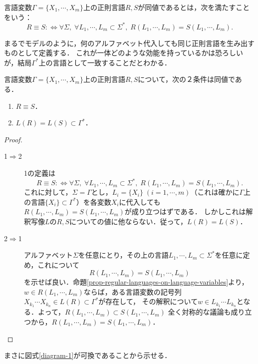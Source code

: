 \documentclass[uplatex, dvipdfmx]{jsreport}
\begin{document}
\begin{definition}[言語変数上の正則表現の同値]\label{def-equivalence-of-universal-regex}
    言語変数$\Gamma=\{X_1,\cdots,X_m\}$上の正則言語$R,S$が同値であるとは，次を満たすことをいう：
    \[ R\equiv S:\Leftrightarrow \forall\Sigma,\;\forall L_1,\cdots,L_m\subset\Sigma^*,\;R(L_1,\cdots,L_m)=S(L_1,\cdots,L_m). \]
\end{definition}
\begin{remarks}
    まるでモデルのように，何のアルファベット代入しても同じ正則言語を生み出すものとして定義する．
    これが一体どのような効能を持っているかは恐ろしいが，結局$\Gamma^*$上の言語として一致することだとわかる．
\end{remarks}

\begin{theorem}[言語変数上の正則表現の同値の特徴付け]
    言語変数$\Gamma=\{X_1,\cdots,X_m\}$上の正則言語$R,S$について，次の２条件は同値である．
    \begin{enumerate}
        \item $R\equiv S$．
        \item $L(R)=L(S)\subset\Gamma^*$．
    \end{enumerate}
\end{theorem}
\begin{proof}\mbox{}
    \begin{description}
        \item[1$\Rightarrow$2] 1の定義は
        \[ R\equiv S:\Leftrightarrow \forall\Sigma,\;\forall L_1,\cdots,L_m\subset\Sigma^*,\;R(L_1,\cdots,L_m)=S(L_1,\cdots,L_m). \]
        これに対して，$\Sigma=\Gamma$とし，$L_i=\{X_i\}\;(i=1,\cdots,m)$（これは確かに$\Gamma$上の言語$\{X_i\}\subset\Gamma^*$）を各変数$X_i$に代入しても
        $R(L_1,\cdots,L_m)=S(L_1,\cdots,L_m)$が成り立つはずである．
        しかしこれは解釈写像$L$の$R,S$についての値に他ならない．従って，$L(R)=L(S)$．
        \item[2$\Rightarrow$1] アルファベット$\Sigma$を任意にとり，その上の言語$L_1,\cdots,L_m\subset\Sigma^*$を任意に定め，これについて
        \[ R(L_1,\cdots,L_m)=S(L_1,\cdots,L_m) \]
        を示せば良い．命題\ref{prop-regular-languages-on-language-variables}より，$w\in R(L_1,\cdots,L_m)$ならば，ある言語変数の記号列$X_{k_1}\cdots X_{k_n}\in L(R)\subset\Gamma^*$が存在して，
        その解釈について$w\in L_{k_1}\cdots L_{k_n}$となる．よって，$R(L_1,\cdots,L_m)\subset S(L_1,\cdots,L_m)$
        全く対称的な議論も成り立つから，$R(L_1,\cdots,L_m)=S(L_1,\cdots,L_m)$．
    \end{description}
\end{proof}
\begin{remarks}
    まさに図式\ref{diagram-1}が可換であることから示せる．
\end{remarks}
\end{document}
